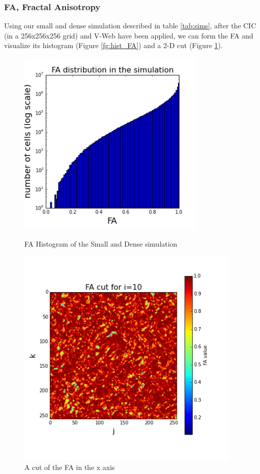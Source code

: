 \documentclass[12pt]{article}
\begin{document}
\subsubsection{FA, Fractal Anisotropy}
Using our small and dense simulation described in table \ref{tab:sims}, after the CIC (in a 256x256x256 grid) and V-Web have been applied, we can form the FA and visualize its histogram (Figure \ref{fg:hist_FA}) and a 2-D cut (Figure \ref{fg:cut_FA}).
\begin{figure}[ht]
\centering
\begin{minipage}{.5\textwidth}
  \centering
  \includegraphics[width=0.8\textwidth]{simulation/FA_hist_sim.png}
  \caption{FA Histogram of the Small and Dense simulation}
\label{fg:hist_FA}
\end{minipage}%
\begin{minipage}{.5\textwidth}
  \centering
  \includegraphics[width=0.95\textwidth]{simulation/FA_cut_i_10.png}
  \caption{A cut of the FA in the x axis}
\label{fg:cut_FA}
\end{minipage}
\end{figure}
\FloatBarrier
\end{document}
